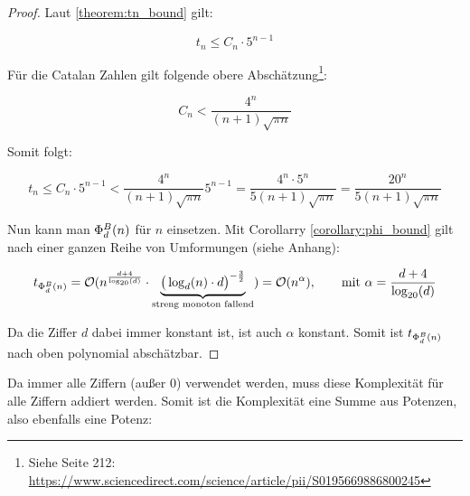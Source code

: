 \documentclass{article}
\theoremstyle{nonumberplain}
\newtheorem{proof}{Beweis}
\begin{document}
\begin{proof}
    Laut \ref{theorem:tn_bound} gilt:

        \[t_n \leq C_n \cdot 5^{n-1}\]

    Für die Catalan Zahlen gilt folgende obere Abschätzung\footnote{Siehe Seite 212: \url{https://www.sciencedirect.com/science/article/pii/S0195669886800245}}:

        \[C_n < \frac{4^n}{(n+1)\sqrt{\pi n}}\]

    
    Somit folgt:

        \[t_n \leq C_n \cdot 5^{n-1} < \frac{4^n}{(n+1)\sqrt{\pi n}} 5^{n-1} = \frac{4^n \cdot 5^n}{5(n+1)\sqrt{\pi n}} = \frac{20^n}{5(n+1)\sqrt{\pi n}}\]

    Nun kann man \(\Phi_{d}^{B}(n)\) für \(n\) einsetzen.
    Mit Corollarry \ref{corollary:phi_bound} gilt nach einer ganzen Reihe von Umformungen (siehe Anhang):%

    
    \begin{equation}
        t_{\Phi_{d}^{B}(n)}
        = \mathcal{O}(n^{\frac{d+4}{\log_{20}(d)}} \cdot \underbrace{\big(\log_d(n) \cdot d\big)^{-\frac{3}{2}}}_{\text{streng monoton fallend}}) \\
        = \mathcal{O}(n^{\alpha}),\qquad\text{mit }\alpha=\frac{d+4}{\log_{20}(d)}
    \end{equation}

    Da die Ziffer \(d\) dabei immer konstant ist, ist auch \(\alpha\) konstant.
    Somit ist \(t_{\Phi_{d}^{B}(n)}\) nach oben polynomial abschätzbar.
\end{proof}

Da immer alle Ziffern (außer 0) verwendet werden, muss diese Komplexität für alle Ziffern addiert werden.
Somit ist die Komplexität eine Summe aus Potenzen, also ebenfalls eine Potenz:
\end{document}
